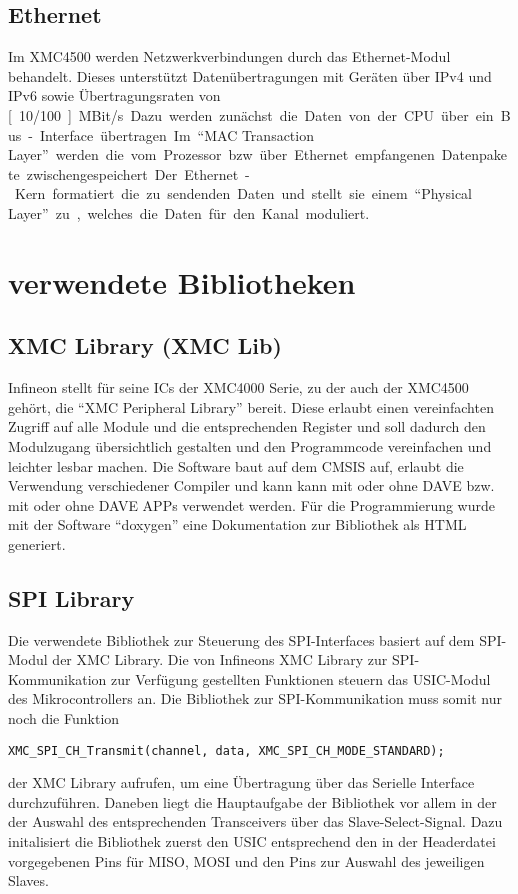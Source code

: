 \subsection{Ethernet} 
Im XMC4500 werden Netzwerkverbindungen durch das  Ethernet-Modul behandelt. Dieses unterstützt Datenübertragungen mit Geräten über IPv4 und IPv6 sowie Übertragungsraten von \unit[10/100]{MBit/s}.  Dazu werden zunächst die Daten von der CPU über ein Bus-Interface übertragen. Im \enquote{MAC Transaction Layer} werden die vom Prozessor bzw. über Ethernet empfangenen Datenpakete zwischengespeichert. Der Ethernet-Kern formatiert die zu sendenden Daten und stellt sie einem \enquote{Physical Layer} zu, welches die Daten für den Kanal moduliert.






\section{verwendete Bibliotheken}
\subsection{XMC Library (XMC Lib)}
Infineon stellt für seine \acp{IC} der XMC4000 Serie, zu der auch der XMC4500 gehört, die \enquote{XMC Peripheral Library} bereit. Diese erlaubt einen vereinfachten Zugriff auf alle Module und die entsprechenden Register und soll dadurch den Modulzugang übersichtlich gestalten und den Programmcode vereinfachen und leichter lesbar machen. Die Software baut auf dem \ac{CMSIS} auf, erlaubt die Verwendung verschiedener Compiler und kann kann mit oder ohne DAVE bzw. mit oder ohne DAVE APPs verwendet werden. %
Für die Programmierung wurde mit der Software \enquote{doxygen} eine Dokumentation zur Bibliothek als HTML generiert.

\subsection{SPI Library}
Die verwendete Bibliothek zur Steuerung des \ac{SPI}-Interfaces basiert auf dem \ac{SPI}-Modul der XMC Library. Die von Infineons XMC Library zur \ac{SPI}-Kommunikation zur Verfügung gestellten Funktionen steuern das \ac{USIC}-Modul des Mikrocontrollers an. Die Bibliothek zur \ac{SPI}-Kommunikation muss somit nur noch die Funktion
\begin{lstlisting}
XMC_SPI_CH_Transmit(channel, data, XMC_SPI_CH_MODE_STANDARD);
\end{lstlisting} der XMC Library aufrufen, um eine Übertragung über das Serielle Interface durchzuführen. Daneben liegt die Hauptaufgabe der Bibliothek vor allem in der der Auswahl des entsprechenden Transceivers über das Slave-Select-Signal. Dazu initalisiert die Bibliothek zuerst den \ac{USIC} entsprechend den in der Headerdatei vorgegebenen Pins für MISO, MOSI und den Pins zur Auswahl des jeweiligen Slaves.

